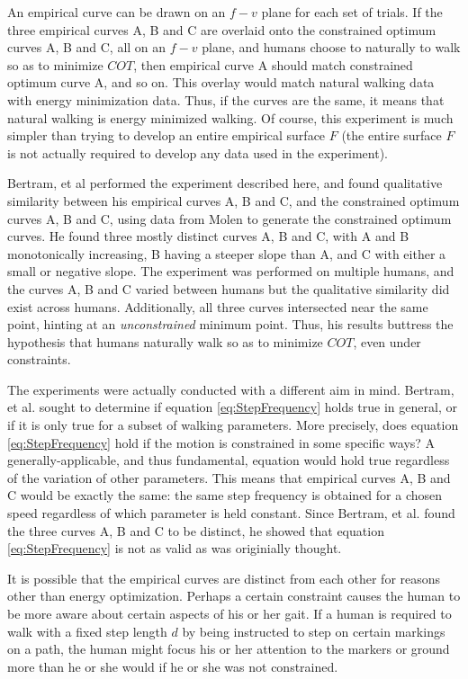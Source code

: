 An empirical curve can be drawn on an $f-v$ plane for each set of trials. If the three empirical curves A, B and C are overlaid onto the constrained optimum curves A, B and C, all on an $f-v$ plane, and humans choose to naturally to walk so as to minimize $COT$, then empirical curve A should match constrained optimum curve A, and so on. This overlay would match natural walking data with energy minimization data. Thus, if the curves are the same, it means that natural walking is energy minimized walking. Of course, this experiment is much simpler than trying to develop an entire empirical surface $F$ (the entire surface $F$ is not actually required to develop any data used in the experiment).

Bertram, et al \cite{bertram01} performed the experiment described here, and found qualitative similarity between his empirical curves A, B and C, and the constrained optimum curves A, B and C, using data from Molen \cite{molen72b} to generate the constrained optimum curves. He found three mostly distinct curves A, B and C, with A and B monotonically increasing, B having a steeper slope than A, and C with either a small or negative slope. The experiment was performed on multiple humans, and the curves A, B and C varied between humans but the qualitative similarity did exist across humans. Additionally, all three curves intersected near the same point, hinting at an \emph{unconstrained} minimum point. Thus, his results buttress the hypothesis that humans naturally walk so as to minimize $COT$, even under constraints.

The experiments were actually conducted with a different aim in mind. Bertram, et al. sought to determine if equation \ref{eq:StepFrequency} holds true in general, or if it is only true for a subset of walking parameters. More precisely, does equation \ref{eq:StepFrequency} hold if the motion is constrained in some specific ways? A generally-applicable, and thus fundamental, equation would hold true regardless of the variation of other parameters. This means that empirical curves A, B and C would be exactly the same: the same step frequency is obtained for a chosen speed regardless of which parameter is held constant. Since Bertram, et al. found the three curves A, B and C to be distinct, he showed that equation \ref{eq:StepFrequency} is not as valid as was originially thought.

It is possible that the empirical curves are distinct from each other for reasons other than energy optimization. Perhaps a certain constraint causes the human to be more aware about certain aspects of his or her gait. If a human is required to walk with a fixed step length $d$ by being instructed to step on certain markings on a path, the human might focus his or her attention to the markers or ground more than he or she would if he or she was not constrained.


